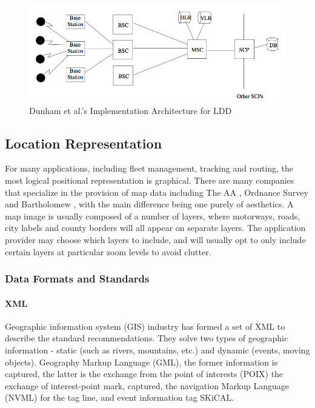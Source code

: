 \documentclass[12pt,a4paper,titlepage]{article}
\begin{document}
\begin{figure}
\centering
\includegraphics[width=\textwidth]{fig/Dunham_LDD}
\caption{Dunham et al.'s Implementation Architecture for LDD}
\label{fig:dunham_ldd}
\end{figure}

\subsection{Location Representation} %
\label{sub:location_representation}
For many applications, including fleet management, tracking and routing, the most logical positional representation is graphical. There are many companies that specialize in the provision of map data including The AA \cite{theaa}, Ordnance Survey \cite{ordnance} and Bartholomew \cite{bartholomew}, with the main difference being one purely of aesthetics. A map image is usually composed of a number of layers, where motorways, roads, city labels and county borders will all appear on separate layers. The application provider may choose which layers to include, and will usually opt to only include certain layers at particular zoom levels to avoid clutter. \cite{DRoza:2003wz}

\subsubsection{Data Formats and Standards} %
\label{ssub:data_formats_and_standards}
\paragraph{XML} %
\label{par:xml}
Geographic information system (GIS) industry has formed a set of XML to describe the standard recommendations. They solve two types of geographic information - static (such as rivers, mountains, etc.) and dynamic (events, moving objects). Geography Markup Language (GML), the former information is captured, the latter is the exchange from the point of interests (POIX) the exchange of interest-point mark, captured, the navigation Markup Language (NVML) for the tag line, and event information tag SKiCAL. \cite{DRoza:2003wz}
\end{document}
